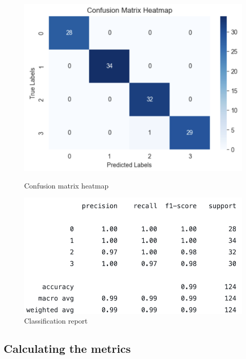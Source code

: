 \begin{figure}[H]
    \centering
    \begin{minipage}{0.48\textwidth}
        \centering
        \includegraphics[scale=0.25]{src/images/heatmap_metric.png}
        \vspace{-0.3cm}
        \caption{Confusion matrix heatmap}
        \label{fig:heatmap}
    \end{minipage}
    \hfill
    \begin{minipage}{0.48\textwidth}
        \centering
        \vspace{0.4cm}
        \includegraphics[scale=0.33]{src/images/cnn_report.png}
        \vspace{0.2cm}
        \caption{Classification report}
        \label{fig:report}
    \end{minipage}
\end{figure}


\subsection{Calculating the metrics}


